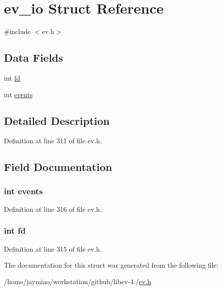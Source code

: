 \hypertarget{structev__io}{\section{ev\-\_\-io \-Struct \-Reference}
\label{structev__io}
}


{\ttfamily \#include $<$ev.\-h$>$}

\subsection*{\-Data \-Fields}
\begin{DoxyCompactItemize}
\item 
int \hyperlink{structev__io_a6f8059414f0228f0256115e024eeed4b}{fd}
\item 
int \hyperlink{structev__io_a81a8a3a775bf2b769ce2a0f687a44c9f}{events}
\end{DoxyCompactItemize}


\subsection{\-Detailed \-Description}


\-Definition at line 311 of file ev.\-h.



\subsection{\-Field \-Documentation}
\hypertarget{structev__io_a81a8a3a775bf2b769ce2a0f687a44c9f}{
\subsubsection[{events}]{\setlength{\rightskip}{0pt plus 5cm}int {\bf events}}}\label{structev__io_a81a8a3a775bf2b769ce2a0f687a44c9f}


\-Definition at line 316 of file ev.\-h.

\hypertarget{structev__io_a6f8059414f0228f0256115e024eeed4b}{
\subsubsection[{fd}]{\setlength{\rightskip}{0pt plus 5cm}int {\bf fd}}}\label{structev__io_a6f8059414f0228f0256115e024eeed4b}


\-Definition at line 315 of file ev.\-h.



\-The documentation for this struct was generated from the following file\-:\begin{DoxyCompactItemize}
\item 
/home/jaymiao/workstation/github/libev-\/4./\hyperlink{ev_8h}{ev.\-h}\end{DoxyCompactItemize}
